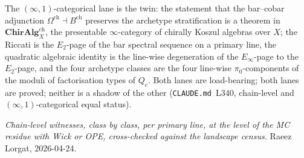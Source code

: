The $(\infty, 1)$-categorical lane is the twin: the statement that
the bar--cobar adjunction
$\Omega^{\mathrm{ch}} \dashv B^{\mathrm{ch}}$ preserves the
archetype stratification is a theorem in
$\mathbf{ChirAlg}^{\mathrm{ch}}_{X}$, the presentable
$\infty$-category of chirally Koszul algebras over $X$; the Riccati
is the $E_2$-page of the bar spectral sequence on a primary line,
the quadratic algebraic identity is the line-wise degeneration of
the $E_\infty$-page to the $E_2$-page, and the four archetype classes
are the four line-wise $\pi_0$-components of the moduli of
factorisation types of $Q_c$. Both lanes are load-bearing; both
lanes are proved; neither is a shadow of the other
(\texttt{CLAUDE.md}~L340, chain-level and $(\infty,1)$-categorical
equal status).

\emph{Chain-level witnesses, class by class, per primary line, at the
level of the MC residue with Wick or OPE, cross-checked against the
landscape census.} Raeez Lorgat, 2026-04-24.
